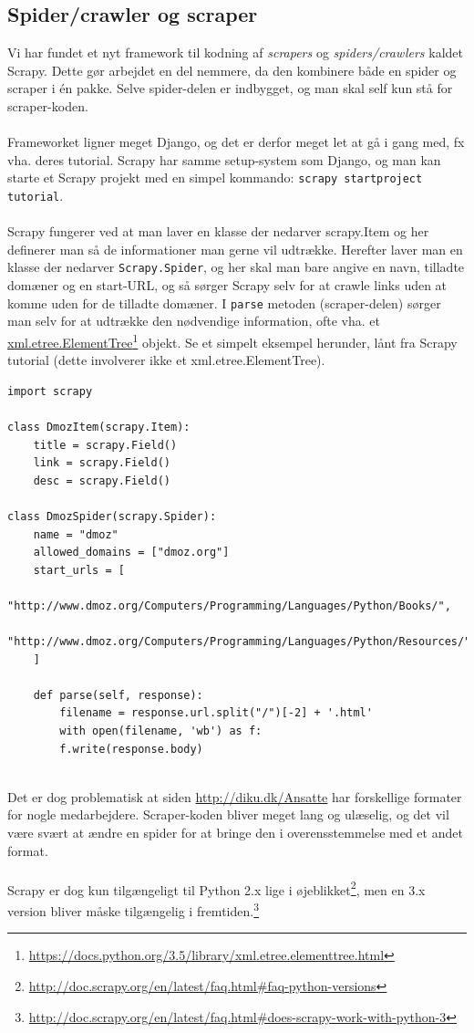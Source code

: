 \documentclass[11pt]{article}
\begin{document}
\subsection{Spider/crawler og scraper}
Vi har fundet et nyt framework til kodning af \textit{scrapers} og \textit{spiders/crawlers} kaldet Scrapy. Dette gør arbejdet en del nemmere, da den kombinere både en spider og scraper i én pakke. Selve spider-delen er indbygget, og man skal self kun stå for scraper-koden.\\
\\
Frameworket ligner meget Django, og det er derfor meget let at gå i gang med, fx vha. deres tutorial. Scrapy har samme setup-system som Django, og man kan starte et Scrapy projekt med en simpel kommando: \texttt{scrapy startproject tutorial}.\\
\\
Scrapy fungerer ved at man laver en klasse der nedarver scrapy.Item og her definerer man så de informationer man gerne vil udtrække. Herefter laver man en klasse der nedarver \texttt{Scrapy.Spider}, og her skal man bare angive en navn, tilladte domæner og en start-URL, og så sørger Scrapy selv for at crawle links uden at komme uden for de tilladte domæner. I \texttt{parse} metoden (scraper-delen) sørger man selv for at udtrække den nødvendige information, ofte vha. et \href{https://docs.python.org/3.5/library/xml.etree.elementtree.html}{xml.etree.ElementTree}\footnote{\url{https://docs.python.org/3.5/library/xml.etree.elementtree.html}} objekt. Se et simpelt eksempel herunder, lånt fra Scrapy tutorial (dette involverer ikke et xml.etree.ElementTree).\\
\begin{lstlisting}
import scrapy

class DmozItem(scrapy.Item):
    title = scrapy.Field()
    link = scrapy.Field()
    desc = scrapy.Field()

class DmozSpider(scrapy.Spider):
    name = "dmoz"
    allowed_domains = ["dmoz.org"]
    start_urls = [
        "http://www.dmoz.org/Computers/Programming/Languages/Python/Books/",
        "http://www.dmoz.org/Computers/Programming/Languages/Python/Resources/"
    ]

    def parse(self, response):
        filename = response.url.split("/")[-2] + '.html'
        with open(filename, 'wb') as f:
        f.write(response.body)
\end{lstlisting}
~\\
Det er dog problematisk at siden \url{http://diku.dk/Ansatte} har forskellige formater for nogle medarbejdere. Scraper-koden bliver meget lang og ulæselig, og det vil være svært at ændre en spider for at bringe den i overensstemmelse med et andet format.\\
\\
Scrapy er dog kun tilgængeligt til Python 2.x lige i øjeblikket\footnote{\url{http://doc.scrapy.org/en/latest/faq.html\#faq-python-versions}}, men en 3.x version bliver måske tilgængelig i fremtiden.\footnote{\url{http://doc.scrapy.org/en/latest/faq.html\#does-scrapy-work-with-python-3}}\\
\end{document}

